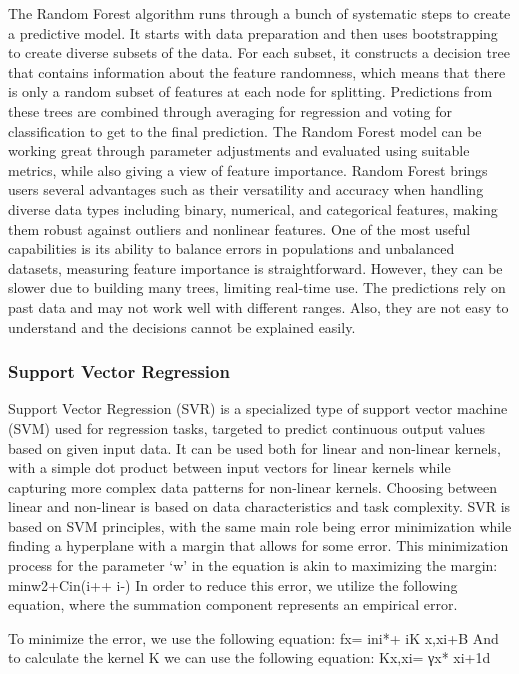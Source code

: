 The Random Forest algorithm runs through a bunch of systematic steps to create a predictive model. It starts with data preparation and then uses bootstrapping to create diverse subsets of the data. For each subset, it constructs a decision tree that contains information about the feature randomness, which means that there is only a random subset of features at each node for splitting. Predictions from these trees are combined through averaging for regression and voting for classification to get to the final prediction. The Random Forest model can be working great through parameter adjustments and evaluated using suitable metrics, while also giving a view of feature importance. 
Random Forest brings users several advantages such as their versatility and accuracy when handling diverse data types including binary, numerical, and categorical features, making them robust against outliers and nonlinear features. One of the most useful capabilities is its ability to balance errors in populations and unbalanced datasets, measuring feature importance is straightforward. However, they can be slower due to building many trees, limiting real-time use. The predictions rely on past data and may not work well with different ranges. Also, they are not easy to understand and the decisions cannot be explained easily.

\subsubsection{Support Vector Regression}
Support Vector Regression (SVR) is a specialized type of support vector machine (SVM) used for regression tasks, targeted to predict continuous output values based on given input data. It can be used both for linear and non-linear kernels, with a simple dot product between input vectors for linear kernels while capturing more complex data patterns for non-linear kernels. Choosing between linear and non-linear is based on data characteristics and task complexity. SVR is based on SVM principles, with the same main role being error minimization while finding a hyperplane with a margin that allows for some error. 
This minimization process for the parameter ‘w’ in the equation is akin to maximizing the margin:
minw2+Cin(i++ i-)  
In order to reduce this error, we utilize the following equation, where the summation component represents an empirical error. 


To minimize the error, we use the following equation:
fx= ini*+ iK x,xi+B
And to calculate the kernel K we can use the following equation: 
Kx,xi= γx* xi+1d 

